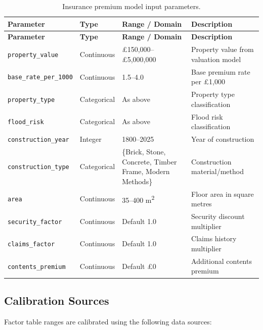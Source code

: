\documentclass[11pt,a4paper]{article}
\begin{document}
\begin{longtable}{p{4cm}p{3cm}p{3cm}p{4.5cm}}
\caption{Insurance premium model input parameters.}
\label{tab:inputs_insurance} \\
\toprule
\textbf{Parameter} & \textbf{Type} & \textbf{Range / Domain} & \textbf{Description} \\
\midrule
\endfirsthead
\toprule
\textbf{Parameter} & \textbf{Type} & \textbf{Range / Domain} & \textbf{Description} \\
\midrule
\endhead
\texttt{property\_value} & Continuous & \pounds150,000--\pounds5,000,000 & Property value from valuation model \\
\midrule
\texttt{base\_rate\_per\_1000} & Continuous & 1.5--4.0 & Base premium rate per \pounds1,000 \\
\midrule
\texttt{property\_type} & Categorical & As above & Property type classification \\
\midrule
\texttt{flood\_risk} & Categorical & As above & Flood risk classification \\
\midrule
\texttt{construction\_year} & Integer & 1800--2025 & Year of construction \\
\midrule
\texttt{construction\_type} & Categorical & \{Brick, Stone, Concrete, Timber Frame, Modern Methods\} & Construction material/method \\
\midrule
\texttt{area} & Continuous & 35--400 m\textsuperscript{2} & Floor area in square metres \\
\midrule
\texttt{security\_factor} & Continuous & Default 1.0 & Security discount multiplier \\
\midrule
\texttt{claims\_factor} & Continuous & Default 1.0 & Claims history multiplier \\
\midrule
\texttt{contents\_premium} & Continuous & Default \pounds0 & Additional contents premium \\
\bottomrule
\end{longtable}

\subsection{Calibration Sources}

Factor table ranges are calibrated using the following data sources:
\end{document}
